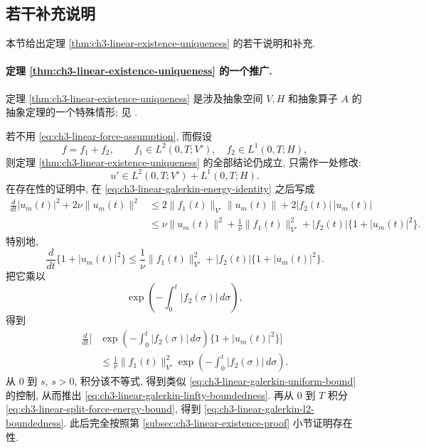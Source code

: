 \subsection{若干补充说明}
\label{subsec:ch3-linear-miscellaneous}
本节给出定理 \ref{thm:ch3-linear-existence-uniqueness} 的若干说明和补充.

\paragraph{定理 \ref{thm:ch3-linear-existence-uniqueness} 的一个推广.}
定理 \ref{thm:ch3-linear-existence-uniqueness} 是涉及抽象空间 $V,H$ 和抽象算子 $A$ 的抽象定理的一个特殊情形; 见 .

若不用 \eqref{eq:ch3-linear-force-assumption}, 而假设
\begin{equation}
f=f_1+f_2,
\qquad f_1\in L^2(0,T;V'),
\quad f_2\in L^1(0,T;H),
\label{eq:ch3-linear-split-force-assumption}
\end{equation}
则定理 \ref{thm:ch3-linear-existence-uniqueness} 的全部结论仍成立, 只需作一处修改:
\begin{equation}
u'\in L^2(0,T;V')+L^1(0,T;H).
\label{eq:ch3-linear-split-derivative-space}
\end{equation}
在存在性的证明中, 在 \eqref{eq:ch3-linear-galerkin-energy-identity} 之后写成
\begin{equation}
\begin{aligned}
\frac d{dt}|u_m(t)|^2+2\nu\lVert u_m(t)\rVert^2
&\leq2\lVert f_1(t)\rVert_{V'}\lVert u_m(t)\rVert
+2|f_2(t)|\,|u_m(t)|\\
&\leq\nu\lVert u_m(t)\rVert^2
+\frac1\nu\lVert f_1(t)\rVert_{V'}^2
+|f_2(t)|\{1+|u_m(t)|^2\}.
\end{aligned}
\label{eq:ch3-linear-split-force-energy-bound}
\end{equation}
特别地,
\begin{equation}
\frac d{dt}\{1+|u_m(t)|^2\}
\leq\frac1\nu\lVert f_1(t)\rVert_{V'}^2
+|f_2(t)|\{1+|u_m(t)|^2\}.
\label{eq:ch3-linear-split-force-gronwall-inequality}
\end{equation}
把它乘以
\[
\exp\left(-\int_0^t|f_2(\sigma)|\,d\sigma\right),
\]
得到
\[
\begin{aligned}
\frac d{dt}\biggl[&\exp\left(-\int_0^t|f_2(\sigma)|\,d\sigma\right)
\{1+|u_m(t)|^2\}\biggr]\\
&\leq\frac1\nu\lVert f_1(t)\rVert_{V'}^2
\exp\left(-\int_0^t|f_2(\sigma)|\,d\sigma\right).
\end{aligned}
\]
从 $0$ 到 $s$, $s>0$, 积分该不等式, 得到类似 \eqref{eq:ch3-linear-galerkin-uniform-bound} 的控制, 从而推出 \eqref{eq:ch3-linear-galerkin-linfty-boundedness}. 再从 $0$ 到 $T$ 积分 \eqref{eq:ch3-linear-split-force-energy-bound}, 得到 \eqref{eq:ch3-linear-galerkin-l2-boundedness}. 此后完全按照第 \ref{subsec:ch3-linear-existence-proof} 小节证明存在性.

